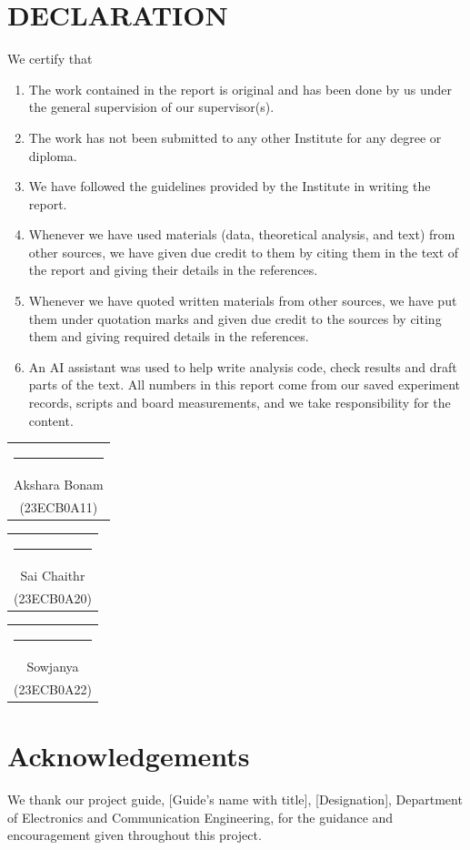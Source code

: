 \documentclass[12pt,a4paper,oneside]{report}
\newcommand{\studentA}{Akshara Bonam}
\newcommand{\rollA}{23ECB0A11}
\newcommand{\studentB}{Sai Chaithr}
\newcommand{\rollB}{23ECB0A20}
\newcommand{\studentC}{Sowjanya}
\newcommand{\rollC}{23ECB0A22}
\newcommand{\guide}{[Guide's name with title]}
\newcommand{\guidedesig}{[Designation]}
\newcommand{\dept}{Electronics and Communication Engineering}
\begin{document}
\chapter*{\centering\large\bfseries DECLARATION}
\thispagestyle{plain}
We certify that
\begin{enumerate}[label=\alph*.]
\item The work contained in the report is original and has been done by us under the general supervision of our
  supervisor(s).
\item The work has not been submitted to any other Institute for any degree or diploma.
\item We have followed the guidelines provided by the Institute in writing the report.
\item Whenever we have used materials (data, theoretical analysis, and text) from other sources, we have given due
  credit to them by citing them in the text of the report and giving their details in the references.
\item Whenever we have quoted written materials from other sources, we have put them under quotation marks and given
  due credit to the sources by citing them and giving required details in the references.
\item An AI assistant was used to help write analysis code, check results and draft parts of the text. All numbers
  in this report come from our saved experiment records, scripts and board measurements, and we take
  responsibility for the content.
\end{enumerate}

\vspace{25mm}
\noindent
\begin{tabular}{@{}c@{}}\rule{42mm}{0.4pt}\\ \studentA\\ (\rollA)\end{tabular}\hfill
\begin{tabular}{@{}c@{}}\rule{42mm}{0.4pt}\\ \studentB\\ (\rollB)\end{tabular}\hfill
\begin{tabular}{@{}c@{}}\rule{42mm}{0.4pt}\\ \studentC\\ (\rollC)\end{tabular}

\chapter*{Acknowledgements}
\thispagestyle{plain}
We thank our project guide, \guide, \guidedesig, Department of \dept, for the guidance and encouragement given
throughout this project.
\end{document}
